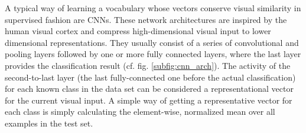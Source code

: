 A typical way of learning a vocabulary whose vectors conserve visual similarity in supervised fashion are \acp{CNN}.
These network architectures are inspired by the human visual cortex and compress high-dimensional visual input to lower dimensional representations.
They usually consist of a series of convolutional and pooling layers followed by one or more fully connected layers, where the last layer provides the classification result (cf. fig. \ref{subfig:cnn_arch}).
The activity of the second-to-last layer (the last fully-connected one before the actual classification) for each known class in the data set can be considered a representational vector for the current visual input.
A simple way of getting a representative vector for each class is simply calculating the element-wise, normalized mean over all examples in the test set.
%

